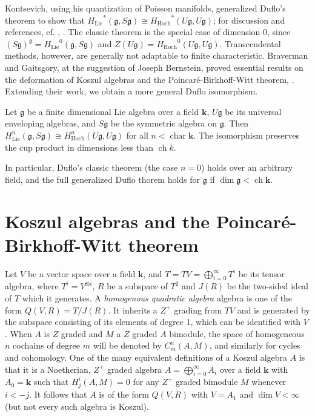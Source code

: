 \documentclass{amsart}
\begin{document}
Kontsevich, using his quantization of Poisson manifolds, generalized Duflo's theorem to show that ${\ensuremath{H_{\text{Lie}}}}^*({\mathfrak{g}}, S{\mathfrak{g}}) \cong {\ensuremath{H_{\text{Hoch}}}}^*(U{\mathfrak{g}},U{\mathfrak{g}})$;  for discussion and references, cf. \cite{Cattaneo et al:Deformation}, \cite{CalaqueRossi:Duflo}. The classic theorem is the special case of dimension 0, since $(S{\mathfrak{g}})^{\mathfrak{g}} = {\ensuremath{H_{\text{Lie}}}}^0({\mathfrak{g}}, S{\mathfrak{g}})$ and $Z(U{\mathfrak{g}}) = {\ensuremath{H_{\text{Hoch}}}}^0(U{\mathfrak{g}},U{\mathfrak{g}})$.  Transcendental methods, however, are generally not adaptable to finite characteristic.
Braverman and Gaitsgory, at the suggestion of Joseph Bernstein, proved essential results on the deformation of Koszul algebras and the   Poincar{\'e}-Birkhoff-Witt theorem, \cite{BravermanGaitsgory:PBW}. Extending their work, we obtain a more general Duflo isomorphism. 

\begin{theorem}\label{Duflo}
Let $\mathfrak g$ be a finite dimensional Lie algebra over a field  $\mathbf k$,  $U\mathfrak g$ be its  universal enveloping algebras, and  $S\mathfrak g$ be the symmetric algebra on $\mathfrak g$.  Then $H_{\text{Lie}}^n(\mathfrak g, S\mathfrak g) \cong H_{\text{Hoch}}^n(U\mathfrak g,U\mathfrak g)$ for all $n < \operatorname{char}\mathbf k$. The isomorphism preserves the cup product in dimensions less than ${\operatorname{ch}} k$. \end{theorem}
In particular, Duflo's classic theorem (the case $n=0$) holds over an arbitrary  field, and the full generalized  Duflo thorem holds for ${\mathfrak{g}}$ if $\dim{\mathfrak{g}}  < {\operatorname{ch}} {\ensuremath{\mathbf{k}}}$.

\section{Koszul algebras and the Poincar{\'e}-Birkhoff-Witt theorem}
Let $V$ be a vector space over a field ${\ensuremath{\mathbf{k}}}$, and $T = TV = \bigoplus_{i=0}^{\infty} T^i$ be its tensor algebra, where $T^i = V^{\otimes i}$, $R$ be a subspace of $T^2$ and $J(R)$ be the two-sided ideal of $T$ which it generates. A \emph{homogenous quadratic algebra} algebra is one of the form  $Q(V,R) = T/J(R)$.  It inherits a $Z^+$ grading from $TV$ and is generated by the subspace consisting of  its elements of degree 1, which can be identified with $V$.  When $A$ is $Z$ graded and $M$ a $Z$ graded $A$ bimodule, the space of homogeneous $n$ cochains of degree $m$ will be denoted by $C^n_m(A,M)$, and similarly for cycles and cohomology.  One of the many equivalent definitions of a Koszul algebra $A$ is that it is a Noetherian, $Z^+$ graded algebra $A= \bigoplus_{i=0}^{\infty}A_i$ over a field ${\ensuremath{\mathbf{k}}}$ with $A_0 = {\ensuremath{\mathbf{k}}}$ such that $H^i_j(A,M) = 0$ for any $Z^+$ graded bimodule $M$ whenever $i <-j$.  It follows that $A$ is of the form $Q(V,R)$ with $V= A_1$ and $\dim V < \infty$ (but not every such algebra is Koszul).  
\end{document}
